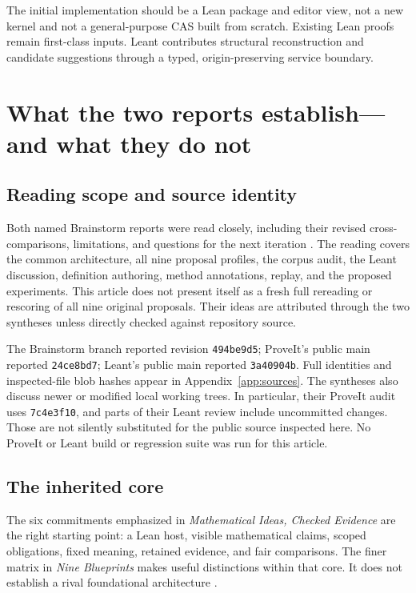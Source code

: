 \documentclass[11pt,a4paper]{article}
\newcommand{\code}[1]{\nolinkurl{#1}}
\theoremstyle{definition}
\begin{document}
The initial implementation should be a Lean package and editor view, not a new
kernel and not a general-purpose CAS built from scratch. Existing Lean proofs
remain first-class inputs. Leant contributes structural reconstruction and
candidate suggestions through a typed, origin-preserving service boundary.

\clearpage
\section{What the two reports establish---and what they do not}
\label{sec:reading}
\subsection{Reading scope and source identity}
Both named Brainstorm reports were read closely, including their revised
cross-comparisons, limitations, and questions for the next iteration
\cite{syn-a,syn-b}. The reading covers the common architecture, all nine proposal
profiles, the corpus audit, the Leant discussion, definition authoring, method
annotations, replay, and the proposed experiments. This article does not present
itself as a fresh full rereading or rescoring of all nine original proposals.
Their ideas are attributed through the two syntheses unless directly checked
against repository source.

The Brainstorm branch reported revision \code{494be9d5}; ProveIt's public main
reported \code{24ce8bd7}; Leant's public main reported \code{3a40904b}. Full
identities and inspected-file blob hashes appear in Appendix~\ref{app:sources}.
The syntheses also discuss newer or modified local working trees. In particular,
their ProveIt audit uses \code{7c4e3f10}, and parts of their Leant review include
uncommitted changes. Those are not silently substituted for the public source
inspected here. No ProveIt or Leant build or regression suite was run for this
article.

\subsection{The inherited core}
The six commitments emphasized in \emph{Mathematical Ideas, Checked Evidence}
are the right starting point: a Lean host, visible mathematical claims,
scoped obligations, fixed meaning, retained evidence, and fair comparisons.
The finer matrix in \emph{Nine Blueprints} makes useful distinctions within
that core. It does not establish a rival foundational architecture
\cite{syn-a,syn-b}.
\end{document}
